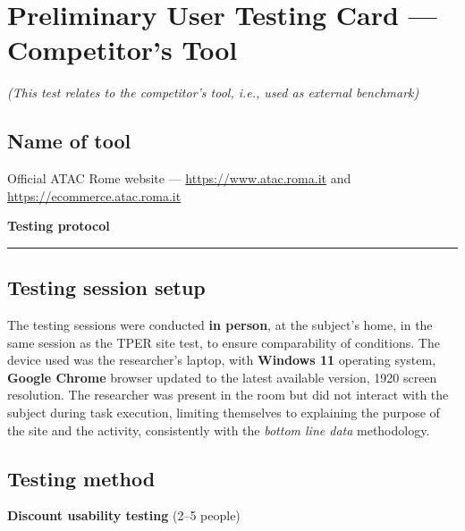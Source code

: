 ﻿\documentclass[11pt,a4paper]{article}
\begin{document}
\newpage
\section{Preliminary User Testing Card --- Competitor's Tool}
\textit{(This test relates to the competitor's tool, i.e., used as external benchmark)}
\vspace{0.2cm}

\subsection*{Name of tool}
\begin{tcolorbox}[base]
Official ATAC Rome website --- \url{https://www.atac.roma.it} and \url{https://ecommerce.atac.roma.it}
\end{tcolorbox}

\vspace{0.2cm}

\begin{center}
  {\color{secondaryColor}\large\bfseries Testing protocol}
  \vspace{0.1cm}
  \color{borderColor}\hrule
\end{center}

\vspace{0.2cm}

\subsection*{Testing session setup}
\begin{tcolorbox}[base]
The testing sessions were conducted \textbf{in person},
at the subject's home, in the same session as the TPER site test,
to ensure comparability of conditions.
The device used was the researcher's laptop,
with \textbf{Windows 11} operating system,
\textbf{Google Chrome} browser updated to the latest available
version, 1920 screen resolution. The researcher
was present in the room but did not interact with the
subject during task execution, limiting themselves to explaining the purpose of the site and the activity, consistently
with the \textit{bottom line data} methodology.
\end{tcolorbox}

\vspace{0.2cm}

\subsection*{Testing method}
\textbf{Discount usability testing}
(2--5 people)
\end{document}
